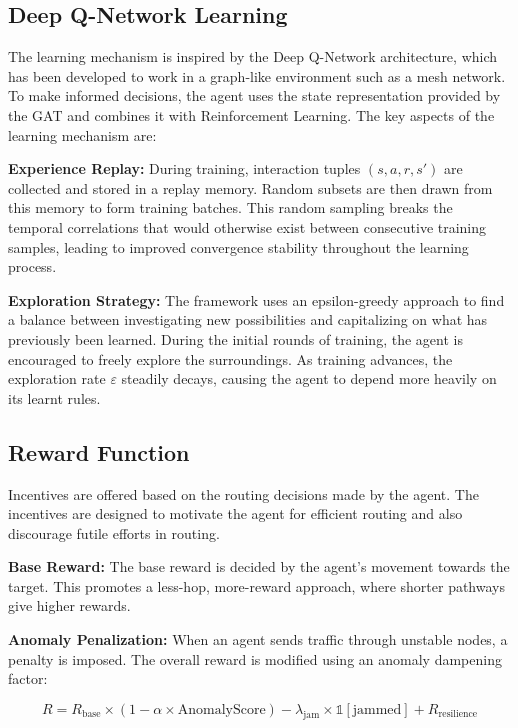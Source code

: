 \documentclass[conference]{IEEEtran}
\begin{document}
\subsection{Deep Q-Network Learning}

The learning mechanism is inspired by the Deep Q-Network architecture, which has been developed to work in a graph-like environment such as a mesh network. To make informed decisions, the agent uses the state representation provided by the GAT and combines it with Reinforcement Learning. The key aspects of the learning mechanism are:

\textbf{Experience Replay:} During training, interaction tuples $(s, a, r, s')$ are collected and stored in a replay memory. Random subsets are then drawn from this memory to form training batches. This random sampling breaks the temporal correlations that would otherwise exist between consecutive training samples, leading to improved convergence stability throughout the learning process.

\textbf{Exploration Strategy:} The framework uses an epsilon-greedy approach to find a balance between investigating new possibilities and capitalizing on what has previously been learned. During the initial rounds of training, the agent is encouraged to freely explore the surroundings. As training advances, the exploration rate $\varepsilon$ steadily decays, causing the agent to depend more heavily on its learnt rules.

\subsection{Reward Function}

Incentives are offered based on the routing decisions made by the agent. The incentives are designed to motivate the agent for efficient routing and also discourage futile efforts in routing.

\textbf{Base Reward:} The base reward is decided by the agent's movement towards the target. This promotes a less-hop, more-reward approach, where shorter pathways give higher rewards.

\textbf{Anomaly Penalization:} When an agent sends traffic through unstable nodes, a penalty is imposed. The overall reward is modified using an anomaly dampening factor:

\begin{equation}
R = R_{\text{base}} \times (1 - \alpha \times \text{AnomalyScore}) - \lambda_{\text{jam}} \times \mathbb{1}[\text{jammed}] + R_{\text{resilience}}
\end{equation}
\end{document}
